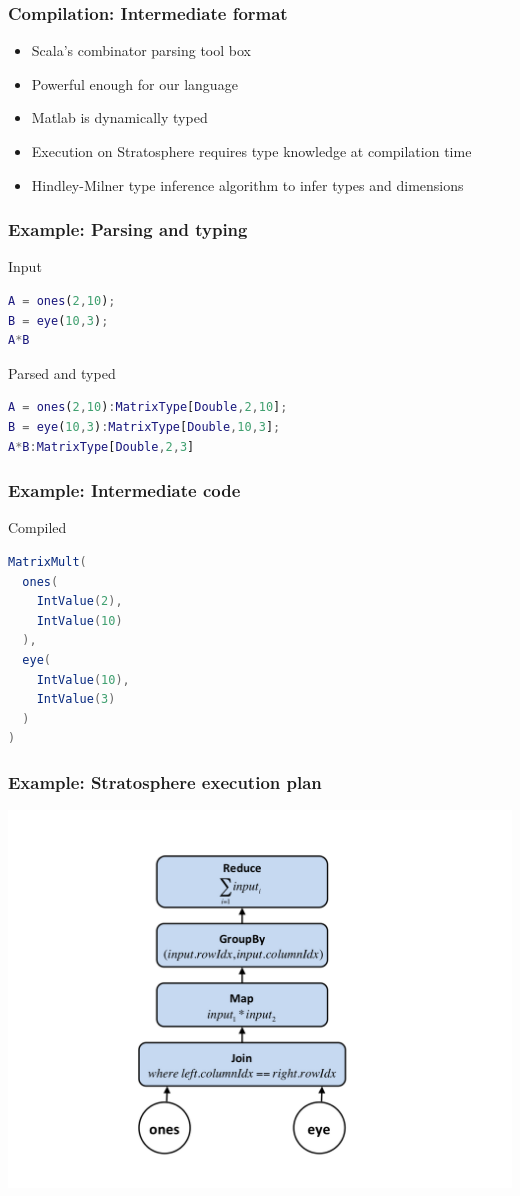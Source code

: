 \begin{frame}
	\frametitle{Compilation: Intermediate format}
	\begin{itemize}
		\item Scala's combinator parsing tool box
		\item Powerful enough for our language
		\item Matlab is dynamically typed
		\item Execution on Stratosphere requires type knowledge at compilation time
		\item Hindley-Milner type inference algorithm to infer types and dimensions
	\end{itemize}
\end{frame}

\begin{frame}[fragile]
	\frametitle{Example: Parsing and typing}
	\begin{block}{Input}
\begin{lstlisting}[language=Matlab]
A = ones(2,10);
B = eye(10,3);
A*B
\end{lstlisting}
\end{block}
	
\begin{block}{Parsed and typed}	
\begin{lstlisting}[language=Matlab]
A = ones(2,10):MatrixType[Double,2,10];
B = eye(10,3):MatrixType[Double,10,3];
A*B:MatrixType[Double,2,3]
\end{lstlisting}
\end{block}

\end{frame}

\begin{frame}[fragile]
	\frametitle{Example: Intermediate code}
	\begin{block}{Compiled}
\begin{lstlisting}[columns=flexible, language=Java]
MatrixMult(
  ones(
    IntValue(2),
    IntValue(10)
  ), 
  eye(
    IntValue(10),
    IntValue(3)
  )
)
\end{lstlisting}
	\end{block}
\end{frame}

\begin{frame}
	\frametitle{Example: Stratosphere execution plan}
	\begin{center}
		\includegraphics[height=0.9\textheight]{images/matrixMultDataflow.png}
	\end{center}
\end{frame}